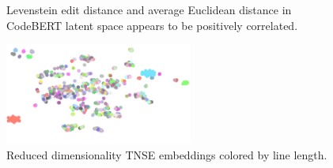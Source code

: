 \documentclass[11pt]{article}
\begin{document}
\begin{figure}[H]
  \centering
  \caption{Levenstein edit distance and average Euclidean distance in CodeBERT latent space appears to be positively correlated.}
  \end{figure}

\begin{figure}[H]
  \centering
  \includegraphics[width=0.55\textwidth]{embeddings}
  \caption{Reduced dimensionality TNSE embeddings colored by line length.}
\end{figure}

  
  
\end{document}
